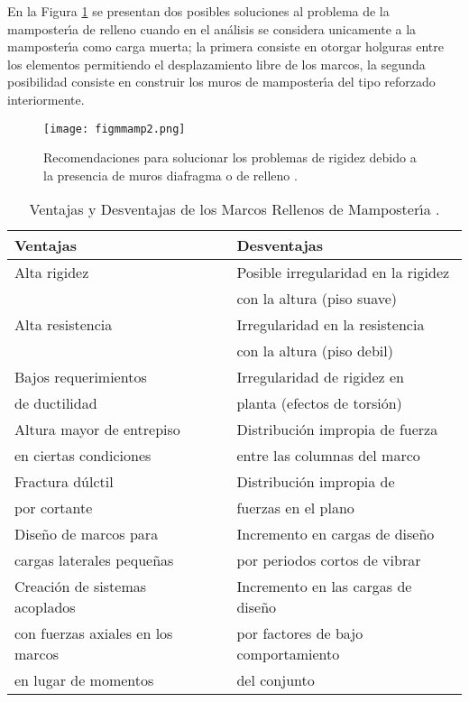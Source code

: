 En la Figura \ref{fig:figm2} se presentan dos posibles soluciones al problema de la mamposter\'{\i}a de relleno cuando en el an\'alisis se considera unicamente a la mamposter\'{\i}a como carga muerta; la primera consiste en otorgar holguras entre los elementos permitiendo el desplazamiento libre de los marcos, la segunda posibilidad consiste en construir los muros de mamposter\'{\i}a del tipo reforzado interiormente.

\begin{figure}
	\centering
		\texttt{[image: figmmamp2.png]}
	\caption{Recomendaciones para solucionar los problemas de rigidez debido a la presencia de muros diafragma o de relleno \cite{NTC2004}.}
	\label{fig:figm2}
\end{figure}

	\begin{table}
	\centering
		\caption{Ventajas y Desventajas de los Marcos Rellenos de Mamposter\'{\i}a \cite{MR2012}.}
		\begin{tabular}{lcl}
			\hline \hline Ventajas  &  & Desventajas \\ \hline \hline
			Alta rigidez  &  & Posible irregularidad en la rigidez \\
			&  & con la altura (piso suave) \\ \hline
			Alta resistencia  &  & Irregularidad en la resistencia \\
			&  &  con la altura (piso debil) \\ \hline
			Bajos requerimientos  &  & Irregularidad de rigidez en \\
			de ductilidad & & planta (efectos de torsi\'on) \\ \hline
			Altura mayor de entrepiso  &  & Distribuci\'on impropia de fuerza \\ 
			en ciertas condiciones & & entre las columnas del marco \\ \hline
			Fractura d\'ulctil  &  & Distribuci\'on impropia de\\
		  por cortante & & fuerzas en el plano \\ \hline
			Dise\~no de marcos para  &  & Incremento en cargas de dise\~no \\
			cargas laterales peque\~nas & & por periodos cortos de vibrar\\ \hline
			Creaci\'on de sistemas acoplados &  & Incremento en las cargas de dise\~no \\ 
			con fuerzas axiales en los marcos  &  & por factores de bajo comportamiento \\ 
			en lugar de momentos & & del conjunto \\  \hline \hline
		\end{tabular}
	\label{tab:ventajas}
\end{table}

